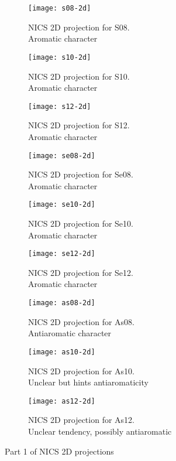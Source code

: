 \begin{figure*}[h]
\centering
\begin{subfigure}{5.5cm}\centering\texttt{[image: s08-2d]}\caption{NICS 2D projection for S08.\\Aromatic character}\end{subfigure}%
\begin{subfigure}{5.5cm}\centering\texttt{[image: s10-2d]}\caption{NICS 2D projection for S10.\\Aromatic character}\end{subfigure}%
\begin{subfigure}{5.5cm}\centering\texttt{[image: s12-2d]}\caption{NICS 2D projection for S12.\\Aromatic character}\end{subfigure}
\begin{subfigure}{5.5cm}\centering\texttt{[image: se08-2d]}\caption{NICS 2D projection for Se08.\\Aromatic character}\end{subfigure}%
\begin{subfigure}{5.5cm}\centering\texttt{[image: se10-2d]}\caption{NICS 2D projection for Se10.\\Aromatic character}\end{subfigure}%
\begin{subfigure}{5.5cm}\centering\texttt{[image: se12-2d]}\caption{NICS 2D projection for Se12.\\Aromatic character}\end{subfigure}
\begin{subfigure}{5.5cm}\centering\texttt{[image: as08-2d]}\caption{NICS 2D projection for As08.\\Antiaromatic character}\end{subfigure}%
\begin{subfigure}{5.5cm}\centering\texttt{[image: as10-2d]}\caption{NICS 2D projection for As10.\\Unclear but hints antiaromaticity}\end{subfigure}%
\begin{subfigure}{5.5cm}\centering\texttt{[image: as12-2d]}\caption{NICS 2D projection for As12.\\Unclear tendency, possibly antiaromatic}\end{subfigure}
\caption[Part 1 of NICS 2D projections]{Part 1 of NICS 2D projections}
\end{figure*}

\newpage

